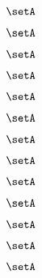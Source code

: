 \begin{forslides}
    \begin{equation}
        \label{eq:slides-processes-152}
        \setA
    \end{equation}

    \begin{equation}
        \label{eq:slides-processes-153}
        \setA
    \end{equation}

    \begin{equation}
        \label{eq:slides-processes-154}
        \setA
    \end{equation}

    \begin{equation}
        \label{eq:slides-processes-155}
        \setA
    \end{equation}

    \begin{equation}
        \label{eq:slides-processes-156}
        \setA
    \end{equation}

    \begin{equation}
        \label{eq:slides-processes-157}
        \setA
    \end{equation}

    \begin{equation}
        \label{eq:slides-processes-158}
        \setA
    \end{equation}

    \begin{equation}
        \label{eq:slides-processes-159}
        \setA
    \end{equation}

    \begin{equation}
        \label{eq:slides-processes-160}
        \setA
    \end{equation}

    \begin{equation}
        \label{eq:slides-processes-161}
        \setA
    \end{equation}

    \begin{equation}
        \label{eq:slides-processes-162}
        \setA
    \end{equation}

    \begin{equation}
        \label{eq:slides-processes-163}
        \setA
    \end{equation}

    \begin{equation}
        \label{eq:slides-processes-164}
        \setA
    \end{equation}


\end{forslides}
